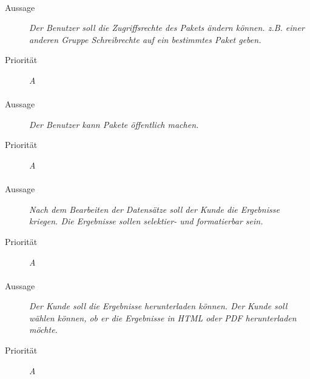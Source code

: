 \paragraph{}
\begin{description}
\item[Aussage] \textit{Der Benutzer soll die Zugriffsrechte des Pakets ändern können. z.B. einer anderen Gruppe Schreibrechte auf ein bestimmtes Paket geben.}
\item[Priorität] \textit{A}
\end{description}

\paragraph{}
\begin{description}
\item[Aussage] \textit{Der Benutzer kann Pakete öffentlich machen.}
\item[Priorität] \textit{A}
\end{description}

\paragraph{}
\begin{description}
\item[Aussage] \textit{Nach dem Bearbeiten der Datensätze soll der Kunde die Ergebnisse kriegen. Die Ergebnisse sollen selektier- und formatierbar sein.}
\item[Priorität] \textit{A}
\end{description}

\paragraph{}
\begin{description}
\item[Aussage] \textit{Der Kunde soll die Ergebnisse herunterladen können. Der Kunde soll wählen können, ob er die Ergebnisse in HTML oder PDF herunterladen möchte.}
\item[Priorität] \textit{A}
\end{description}
